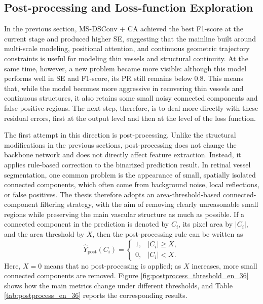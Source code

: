 \documentclass[a4paper,11pt]{article}
\begin{document}
\subsection{Post-processing and Loss-function Exploration}
In the previous section, MS-DSConv + CA achieved the best F1-score at the current stage and produced higher SE, suggesting that the mainline built around multi-scale modeling, positional attention, and continuous geometric trajectory constraints is useful for modeling thin vessels and structural continuity. At the same time, however, a new problem became more visible: although this model performs well in SE and F1-score, its PR still remains below 0.8. This means that, while the model becomes more aggressive in recovering thin vessels and continuous structures, it also retains some small noisy connected components and false-positive regions. The next step, therefore, is to deal more directly with these residual errors, first at the output level and then at the level of the loss function.

The first attempt in this direction is post-processing. Unlike the structural modifications in the previous sections, post-processing does not change the backbone network and does not directly affect feature extraction. Instead, it applies rule-based correction to the binarized prediction result. In retinal vessel segmentation, one common problem is the appearance of small, spatially isolated connected components, which often come from background noise, local reflections, or false positives. The thesis therefore adopts an area-threshold-based connected-component filtering strategy, with the aim of removing clearly unreasonable small regions while preserving the main vascular structure as much as possible. If a connected component in the prediction is denoted by \(C_i\), its pixel area by \(|C_i|\), and the area threshold by \(X\), then the post-processing rule can be written as
\begin{equation}
\hat{Y}_{\mathrm{post}}(C_i)=
\begin{cases}
1, & |C_i| \ge X,\\
0, & |C_i| < X.
\end{cases}
\end{equation}
Here, \(X=0\) means that no post-processing is applied; as \(X\) increases, more small connected components are removed. Figure \ref{fig:postprocess_threshold_en_36} shows how the main metrics change under different thresholds, and Table \ref{tab:postprocess_en_36} reports the corresponding results.
\end{document}
